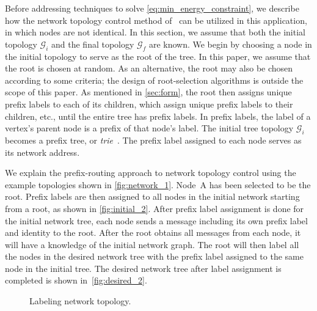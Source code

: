 \documentclass[10pt,conference]{IEEEtran}
\begin{document}
Before addressing techniques to solve
\eqref{eq:min_energy_constraint}, we describe how the network topology
control method of~\cite{BomMILCOM11} can be utilized in this
application, in which nodes are not identical.  In this section, we
assume that both the initial topology $\mathcal{G}_i$ and the final
topology $\mathcal{G}_f$ are known.  We begin by choosing a node in
the initial topology to serve as the root of the tree.  In this paper,
we assume that the root is chosen at random.  As an alternative, the
root may also be chosen according to some criteria; the design of
root-selection algorithms is outside the scope of this paper.  As
mentioned in \autoref{sec:form}, the root then assigns unique prefix
labels to each of its children, which assign unique prefix labels to
their children, etc., until the entire tree has prefix labels.  In
prefix labels, the label of a vertex's parent node is a prefix of that
node's label.  The initial tree topology $\mathcal{G}_{i}$ becomes a
prefix tree, or {\it trie}~\cite{CLRbook,Drozdek,Horowitz}.  The
prefix label assigned to each node serves as its network address.


We explain the prefix-routing approach to network topology control
using the example topologies shown in \autoref{fig:network_1}.  Node~A
has been selected to be the root.  Prefix labels are then assigned to
all nodes in the initial network starting from a root, as shown in
\autoref{fig:initial_2}.  After prefix label assignment is done for
the initial network tree, each node sends a message including its own
prefix label and identity to the root. After the root obtains all
messages from each node, it will have a knowledge of the initial
network graph.  The root will then label all the nodes in the desired
network tree with the prefix label assigned to the same node in the
initial tree.  The desired network tree after label assignment is
completed is shown in~\autoref{fig:desired_2}.

\begin{figure}[t]
\centering
{}
\caption{Labeling network topology.} \label{fig:network_2}
\end{figure}
\end{document}
